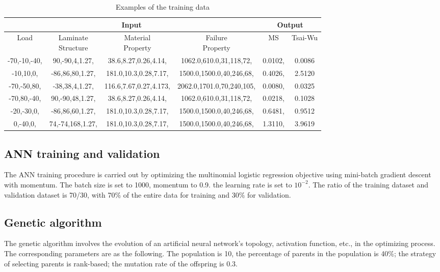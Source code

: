 \documentclass[letterpaper]{IEEEtran}
\begin{document}
\begin{table}[!t]	
\centering
\caption{Examples of the training data}
\label{tab:traing-data}
\begin{adjustbox}{width=0.5\textwidth}
	\begin{tabular}{cccc|cc}
		\toprule
		\multicolumn{4}{c}{\textbf{Input}} &  \multicolumn{2}{c}{\textbf{Output}} \\
		\midrule
		Load  &  \makecell{Laminate \\ Structure }  & \makecell{Material \\ Property} & \makecell{Failure \\  Property}  & MS & Tsai-Wu \\
		\midrule

		-70,-10,-40,  & 90,-90,4,1.27, & 38.6,8.27,0.26,4.14,  & 1062.0,610.0,31,118,72,  & 0.0102, & 0.0086 \\
		-10,10,0,     & -86,86,80,1.27,& 181.0,10.3,0.28,7.17, & 1500.0,1500.0,40,246,68, & 0.4026, & 2.5120 \\
		-70,-50,80,   & -38,38,4,1.27, & 116.6,7.67,0.27,4.173,& 2062.0,1701.0,70,240,105,& 0.0080, & 0.0325 \\
		-70,80,-40,   & 90,-90,48,1.27,& 38.6,8.27,0.26,4.14,  & 1062.0,610.0,31,118,72,  & 0.0218, & 0.1028 \\
		-20,-30,0,    & -86,86,60,1.27,& 181.0,10.3,0.28,7.17, & 1500.0,1500.0,40,246,68, & 0.6481, & 0.9512 \\
		0,-40,0,      & 74,-74,168,1.27,& 181.0,10.3,0.28,7.17,& 1500.0,1500.0,40,246,68, & 1.3110, & 3.9619 \\
		\bottomrule
		\end{tabular}
\end{adjustbox}
\end{table}
\subsection{ANN training and validation}
The ANN training procedure is carried out by optimizing the multinomial logistic
regression objective using mini-batch gradient
descent\cite{lecun1989backpropagation} with momentum. The batch size is set to
1000, momentum to 0.9. the learning rate is set to $10^{-2}$. The ratio of the
training dataset and validation dataset is 70/30, with 70\% of the entire data
for training and 30\% for validation.

\subsection{Genetic algorithm}
The genetic algorithm involves the evolution of an artificial neural network’s
topology, activation function, etc., in the optimizing process.  The
corresponding parameters are as the following. The population is 10, the
percentage of parents in the population is 40\%; the strategy of selecting
parents is rank-based; the mutation rate of the offspring is 0.3.
\end{document}
